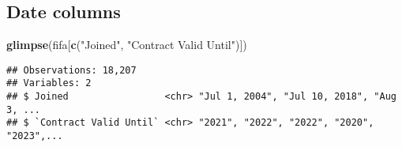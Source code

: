 \documentclass[]{article}
\newenvironment{Shaded}{\begin{snugshade}}{\end{snugshade}}
\newcommand{\CommentTok}[1]{\textcolor[rgb]{0.56,0.35,0.01}{\textit{#1}}}
\newcommand{\DataTypeTok}[1]{\textcolor[rgb]{0.13,0.29,0.53}{#1}}
\newcommand{\DecValTok}[1]{\textcolor[rgb]{0.00,0.00,0.81}{#1}}
\newcommand{\KeywordTok}[1]{\textcolor[rgb]{0.13,0.29,0.53}{\textbf{#1}}}
\newcommand{\NormalTok}[1]{#1}
\newcommand{\OperatorTok}[1]{\textcolor[rgb]{0.81,0.36,0.00}{\textbf{#1}}}
\newcommand{\StringTok}[1]{\textcolor[rgb]{0.31,0.60,0.02}{#1}}
\begin{document}
\begin{Shaded}
\end{Shaded}

\hypertarget{date-columns}{%
\subsection{Date columns}\label{date-columns}}

\begin{Shaded}
\begin{Highlighting}[]
\KeywordTok{glimpse}\NormalTok{(fifa[}\KeywordTok{c}\NormalTok{(}\StringTok{"Joined"}\NormalTok{, }\StringTok{"Contract Valid Until"}\NormalTok{)])}
\end{Highlighting}
\end{Shaded}

\begin{verbatim}
## Observations: 18,207
## Variables: 2
## $ Joined                 <chr> "Jul 1, 2004", "Jul 10, 2018", "Aug 3, ...
## $ `Contract Valid Until` <chr> "2021", "2022", "2022", "2020", "2023",...
\end{verbatim}

\begin{Shaded}
\end{Shaded}
\end{document}
